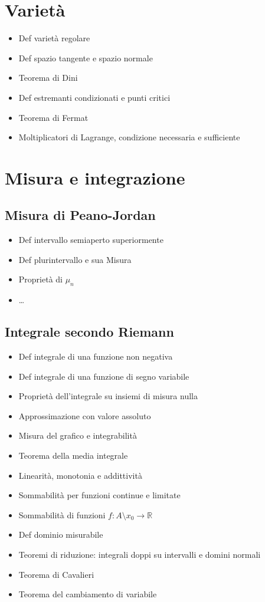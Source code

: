 \documentclass[10pt,a4paper, twocolumn]{article}
\newcommand{\R}{\mathbb{R}}
\renewcommand{\,}{\text{, }}
\begin{document}
\section{Varietà}
\begin{itemize}
    \item Def varietà regolare
    \item Def spazio tangente e spazio normale
    \item Teorema di Dini
    \item Def estremanti condizionati e punti critici
    \item Teorema di Fermat
    \item Moltiplicatori di Lagrange, condizione necessaria e sufficiente
\end{itemize}

\section{Misura e integrazione}
\subsection{Misura di Peano-Jordan}
\begin{itemize}
    \item Def intervallo semiaperto superiormente
    \item Def plurintervallo e sua Misura
    \item Proprietà di $\mu_n$
    \item \dots
\end{itemize}

\subsection{Integrale secondo Riemann}
\begin{itemize}
    \item Def integrale di una funzione non negativa
    \item Def integrale di una funzione di segno variabile
    \item Proprietà dell'integrale su insiemi di misura nulla
    \item Approssimazione con valore assoluto
    \item Misura del grafico e integrabilità
    \item Teorema della media integrale
    \item Linearità, monotonia e addittività
    \item Sommabilità per funzioni continue e limitate
    \item Sommabilità di funzioni $f:A\setminus{x_0} \rightarrow \R$
    \item Def dominio misurabile
    \item Teoremi di riduzione: integrali doppi su intervalli e domini normali
    \item Teorema di Cavalieri
    \item Teorema del cambiamento di variabile
\end{itemize}
\end{document}
